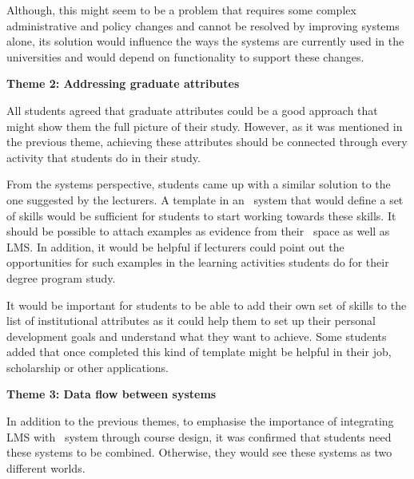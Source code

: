 Although, this might seem to be a problem that requires some complex
administrative and policy changes and cannot be resolved by improving systems
alone, its solution would influence the ways the systems are currently used in
the universities and would depend on functionality to support these changes.

\textbf{Theme 2: Addressing graduate attributes}

All students agreed that graduate attributes could be a good approach that might
show them the full picture of their study. However, as it was mentioned in the
previous theme, achieving these attributes should be connected through every
activity that students do in their study.


From the systems perspective, students came up with a similar solution to the
one suggested by the lecturers. A template in an \ep~system that would define a
set of \LLLs skills would be sufficient for students to start working towards
these skills. It should be possible to attach examples as evidence from their
\ep~space as well as LMS. In addition, it would be helpful if lecturers could
point out the opportunities for such examples in the learning activities
students do for their degree program study.

It would be important for students to be able to add their own set of skills to
the list of institutional attributes as it could help them to set up their
personal development goals and understand what they want to achieve. Some
students added that once completed this kind of template might be helpful in
their job, scholarship or other applications.

\textbf{Theme 3: Data flow between systems}

In addition to the previous themes, to emphasise the importance of integrating
LMS with \ep~system through course design, it was confirmed that students need
these systems to be combined. Otherwise, they would see these systems as two
different worlds.


